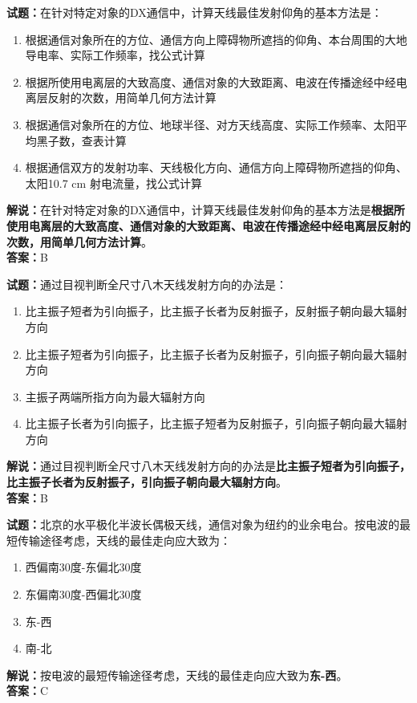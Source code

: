 \documentclass{ctexbook}
\begin{document}
\bigskip


\noindent\textbf{试题：}在针对特定对象的DX通信中，计算天线最佳发射仰角的基本方法是：
\begin{enumerate}[leftmargin=3em]
\item 根据通信对象所在的方位、通信方向上障碍物所遮挡的仰角、本台周围的大地导电率、实际工作频率，找公式计算
\item 根据所使用电离层的大致高度、通信对象的大致距离、电波在传播途经中经电离层反射的次数，用简单几何方法计算
\item 根据通信对象所在的方位、地球半径、对方天线高度、实际工作频率、太阳平均黑子数，查表计算
\item 根据通信双方的发射功率、天线极化方向、通信方向上障碍物所遮挡的仰角、太阳10.7 cm 射电流量，找公式计算
\end{enumerate}
\noindent\textbf{解说：}在针对特定对象的DX通信中，计算天线最佳发射仰角的基本方法是\textbf{根据所使用电离层的大致高度、通信对象的大致距离、电波在传播途经中经电离层反射的次数，用简单几何方法计算}。\\\noindent\textbf{答案：}B



\bigskip


\noindent\textbf{试题：}通过目视判断全尺寸八木天线发射方向的办法是：
\begin{enumerate}[leftmargin=3em]
\item 比主振子短者为引向振子，比主振子长者为反射振子，反射振子朝向最大辐射方向
\item 比主振子短者为引向振子，比主振子长者为反射振子，引向振子朝向最大辐射方向
\item 主振子两端所指方向为最大辐射方向
\item 比主振子长者为引向振子，比主振子短者为反射振子，引向振子朝向最大辐射方向
\end{enumerate}
\noindent\textbf{解说：}通过目视判断全尺寸八木天线发射方向的办法是\textbf{比主振子短者为引向振子，比主振子长者为反射振子，引向振子朝向最大辐射方向}。\\\noindent\textbf{答案：}B

\bigskip


\noindent\textbf{试题：}北京的水平极化半波长偶极天线，通信对象为纽约的业余电台。按电波的最短传输途径考虑，天线的最佳走向应大致为：
\begin{enumerate}[leftmargin=3em]
\item 西偏南30度-东偏北30度
\item 东偏南30度-西偏北30度
\item 东-西
\item 南-北
\end{enumerate}
\noindent\textbf{解说：}按电波的最短传输途径考虑，天线的最佳走向应大致为\textbf{东-西}。\\\noindent\textbf{答案：}C
\end{document}
